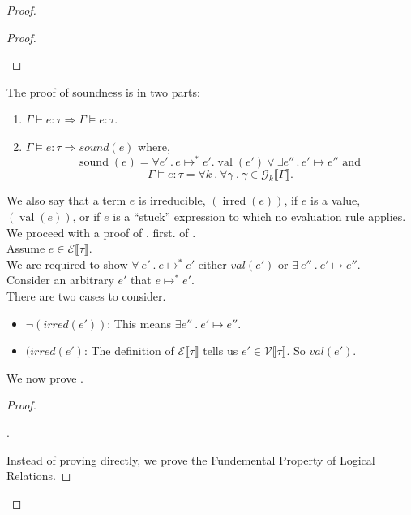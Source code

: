 \documentclass{article}
\newcommand{\RNum}[1]{\uppercase\expandafter{\romannumeral #1\relax}}
\begin{document}
\begin{proof}
\begin{proof}
\begin{itemize}
    
    
    
  \end{itemize}
  
  
\end{proof}


\newpage
The proof of soundness is in two parts:
\newcommand\val{\ensuremath{\operatorname{val}}}
\newcommand\sound{\ensuremath{\operatorname{sound}}}
\newcommand\irred{\ensuremath{\operatorname{irred}}}
\begin{enumerate}[label=\Roman*.]
\item $\Gamma \vdash e : \tau \Rightarrow \Gamma \vDash e : \tau$.  
\item $\Gamma \vDash e : \tau \Rightarrow sound(e)$
  where,
  \[
  \sound(e) = \forall e' \, . \, e \mapsto^* e'. \val(e') \vee \exists e'' \, . \, e' \mapsto e'' \text{ and }\]
     \[\Gamma \vDash e : \tau = \forall k~.~\forall \gamma~.~\gamma \in \mathcal{G}_k \llbracket \Gamma \rrbracket.\]
\end{enumerate}

We also say that a term $e$ is irreducible, $(\irred(e))$, if $e$ is a value, $(\val(e))$, or if $e$ is a “stuck” expression to which no evaluation rule applies.\\

We proceed with a proof of \RNum{2}. first.
\proof of \RNum{2}.\\
Assume $e \in \mathcal{E} \llbracket \tau \rrbracket$. \\
We are required to show $\forall~e'~.~e \mapsto^* e'$ either $val(e')$ or $\exists~e''~.~e' \mapsto e''$.\\
Consider an arbitrary $e'$ that $e \mapsto^* e'$.\\
There are two cases to consider.
\begin{itemize}
\item $\neg (irred (e'))$:
  This means $\exists e''~.~e' \mapsto e''$.
\item $(irred (e')$:
  The definition of $\mathcal{E} \llbracket \tau \rrbracket$ tells us $e' \in \mathcal{V} \llbracket \tau \rrbracket$. So $val(e')$.
\end{itemize}

We now prove \RNum{1}.

\begin{proof}\

  \RNum{1}.

Instead of proving \RNum{1} directly, we prove the Fundemental Property of Logical Relations.
\end{proof}


\end{proof}
\end{document}
